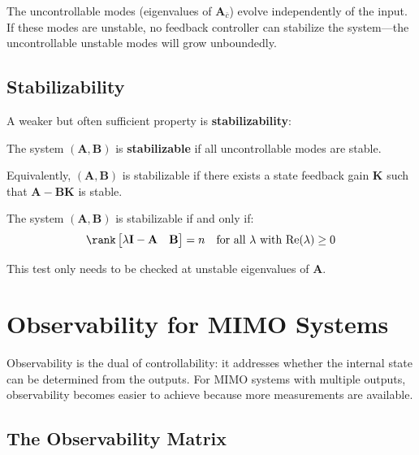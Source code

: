 The uncontrollable modes (eigenvalues of $\mathbf{A}_{\bar{c}}$) evolve independently of the input. If these modes are unstable, no feedback controller can stabilize the system---the uncontrollable unstable modes will grow unboundedly.

\subsection{Stabilizability}

A weaker but often sufficient property is \textbf{stabilizability}:

\begin{definition}[Stabilizability]
The system $(\mathbf{A}, \mathbf{B})$ is \textbf{stabilizable} if all uncontrollable modes are stable.
\end{definition}

Equivalently, $(\mathbf{A}, \mathbf{B})$ is stabilizable if there exists a state feedback gain $\mathbf{K}$ such that $\mathbf{A} - \mathbf{B}\mathbf{K}$ is stable.

\begin{theorem}
The system $(\mathbf{A}, \mathbf{B})$ is stabilizable if and only if:
\begin{equation}
\rank\begin{bmatrix} \lambda\mathbf{I} - \mathbf{A} & \mathbf{B} \end{bmatrix} = n \quad \text{for all } \lambda \text{ with } \text{Re}(\lambda) \geq 0
\end{equation}
\end{theorem}

This test only needs to be checked at unstable eigenvalues of $\mathbf{A}$.


\section{Observability for MIMO Systems}
\label{sec:observability_mimo}

Observability is the dual of controllability: it addresses whether the internal state can be determined from the outputs. For MIMO systems with multiple outputs, observability becomes easier to achieve because more measurements are available.

\subsection{The Observability Matrix}

